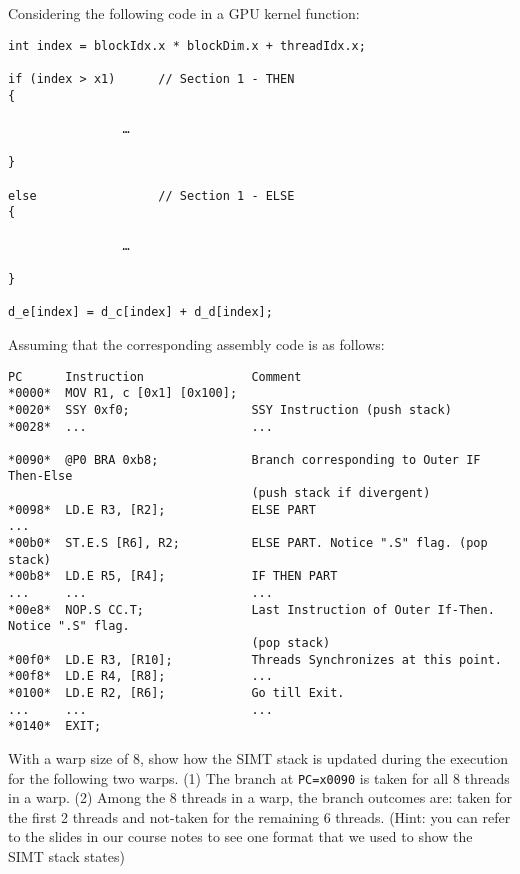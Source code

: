 \documentclass[11pt]{article}
\begin{document}
\section{}

Considering the following code in a GPU kernel function:

\begin{verbatim}
int index = blockIdx.x * blockDim.x + threadIdx.x;

if (index > x1)      // Section 1 - THEN
{   

                …  

}

else                 // Section 1 - ELSE
{

                …

}              

d_e[index] = d_c[index] + d_d[index];
\end{verbatim}

Assuming that the corresponding assembly code is as follows:

\begin{verbatim}
PC      Instruction               Comment
*0000*  MOV R1, c [0x1] [0x100];
*0020*  SSY 0xf0;                 SSY Instruction (push stack)
*0028*  ...                       ...
                                    
*0090*  @P0 BRA 0xb8;             Branch corresponding to Outer IF Then-Else 
                                  (push stack if divergent)
*0098*  LD.E R3, [R2];            ELSE PART
...
*00b0*  ST.E.S [R6], R2;          ELSE PART. Notice ".S" flag. (pop stack)
*00b8*  LD.E R5, [R4];            IF THEN PART
...     ...                       ...
*00e8*  NOP.S CC.T;               Last Instruction of Outer If-Then. Notice ".S" flag. 
                                  (pop stack)
*00f0*  LD.E R3, [R10];           Threads Synchronizes at this point.
*00f8*  LD.E R4, [R8];            ...
*0100*  LD.E R2, [R6];            Go till Exit.
...     ...                       ...
*0140*  EXIT;
\end{verbatim}
With a warp size of 8, show how the SIMT stack is updated during the execution for the following two warps. (1) The branch at \verb|PC=x0090| is taken for all 8 threads in a warp. (2) Among the 8 threads in a warp, the branch outcomes are: taken for the first 2 threads and not-taken for the remaining 6 threads. (Hint: you can refer to the slides in our course notes to see one format that we used to show the SIMT stack states)
\end{document}
